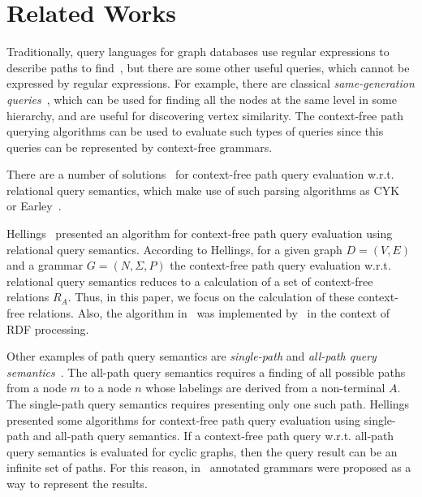 \section{Related Works}
\label{section_related}

Traditionally, query languages for graph databases use regular expressions to describe paths to find~\cite{reutter2017regular, fan2011adding, abiteboul1997regular, nole2016regular, graphDB}, but there are some other useful queries, which cannot be expressed by regular expressions. For example, there are classical \emph{same-generation queries}~\cite{FndDB}, which can be used for finding all the nodes at the same level in some hierarchy, and are useful for discovering vertex similarity. The context-free path querying algorithms can be used to evaluate such types of queries since this queries can be represented by context-free grammars.  

There are a number of solutions~\cite{hellingsRelational, GraphQueryWithEarley, RDF} for context-free path query evaluation w.r.t. relational query semantics, which make use of such parsing algorithms as CYK~\cite{kasami, younger} or Earley~\cite{Grune}.

Hellings~\cite{hellingsRelational} presented an algorithm for context-free path query evaluation using relational query semantics. According to Hellings, for a given graph \mbox{$D = (V, E)$} and a grammar $G = (N, \Sigma, P)$ the context-free path query evaluation w.r.t. relational query semantics reduces to a calculation of a set of context-free relations $R_A$. Thus, in this paper, we focus on the calculation of these context-free relations. Also, the algorithm in~\cite{hellingsRelational} was implemented by~\cite{RDF} in the context of RDF processing.

Other examples of path query semantics are \emph{single-path} and \emph{all-path query semantics}~\cite{hellingsPathQuerying}. The all-path query semantics requires a finding of all possible paths from a node $m$ to a node $n$ whose labelings are derived from a non-terminal $A$. The single-path query semantics requires presenting only one such path. Hellings~\cite{hellingsPathQuerying} presented some algorithms for context-free path query evaluation using single-path and all-path query semantics. If a context-free path query w.r.t. all-path query semantics is evaluated for cyclic graphs, then the query result can be an infinite set of paths. For this reason, in~\cite{hellingsPathQuerying} annotated grammars were proposed as a way to represent the results.

